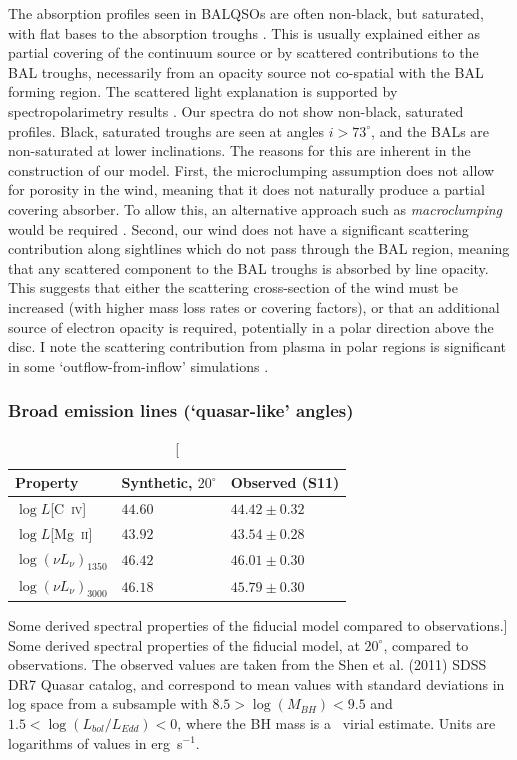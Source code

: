 The absorption profiles seen in BALQSOs are often non-black, but saturated, 
with flat bases to the absorption troughs \citep{arav1999b,arav1999a}.
This is usually explained either as  partial covering of the continuum
source or by scattered contributions to the BAL troughs, necessarily
from an opacity source not co-spatial with the BAL forming region.
The scattered light explanation is supported by spectropolarimetry results
\citep{lamy2000}. Our spectra do not show non-black, saturated profiles.
Black, saturated troughs are seen at angles $i > 73^\circ$, and the BALs
are non-saturated at lower inclinations. The reasons for this are inherent 
in the construction of our model. 
First, the microclumping assumption does not allow for 
porosity in the wind, meaning that it does not naturally produce
a partial covering absorber. To allow this, an alternative approach
such as {\em macroclumping} would be required \citep[e.g.][]{hamann2008,surlan2012}.
Second, our wind does not have a significant scattering contribution 
along sightlines which do not pass through the BAL region,
meaning that any scattered component to the BAL troughs is absorbed by line opacity.
This suggests that either the scattering cross-section of the wind must
be increased (with higher mass loss rates or covering factors), or 
that an additional source of electron opacity is required, potentially
in a polar direction above the disc. I note the scattering contribution
from plasma in polar regions is significant in some `outflow-from-inflow'
simulations \citep{KP09, simproga2012}.

\subsubsection{Broad emission lines (`quasar-like' angles)}

\begin{table}
\centering
\begin{tabular}{p{2cm}p{2cm}p{3cm}}
\hline Property & Synthetic, $20^\circ$ & Observed  (S11) \\ 
\hline \hline
$\log L$[C~\textsc{iv}]  & $44.60$ & $44.42 \pm 0.32$  \\
$\log L$[Mg~\textsc{ii}] & $43.92$ & $43.54 \pm 0.28$  \\
$\log (\nu L_{\nu})_{1350}$  & $46.42$ & $46.01 \pm 0.30$ \\
$\log (\nu L_{\nu})_{3000}$  & $46.18$ & $45.79 \pm 0.30$ \\
\hline
\end{tabular}
\caption
[Some derived spectral properties of the fiducial model compared to observations.]
{
Some derived spectral properties of the fiducial model, at $20^\circ$,
compared to observations. The observed values are taken from the Shen et al. (2011)
SDSS DR7 Quasar catalog, and correspond to mean values with standard deviations in log space
from a subsample with $8.5>\log(M_{BH})<9.5$ and $1.5<\log (L_{bol}/L_{Edd}) < 0$,
where the BH mass is a \civ\ virial estimate. 
Units are logarithms of values in erg~s$^{-1}$.
}
\label{line_lums}
\end{table}


